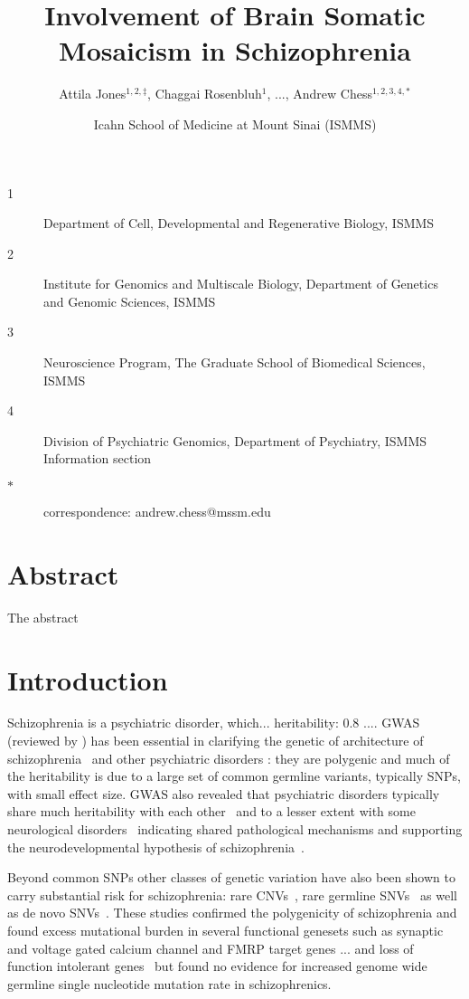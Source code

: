 \documentclass[letterpaper]{article}
\title{Involvement of Brain Somatic Mosaicism in Schizophrenia}
\author{Attila Jones\(^{1,2,\ddagger}\), Chaggai Rosenbluh\(^{1}\), ..., Andrew Chess\(^{1,2,3,4,\ast}\)}
\date{Icahn School of Medicine at Mount Sinai (ISMMS)}
\begin{document}
\maketitle

\begin{description}
\item[1] Department of Cell, Developmental and Regenerative Biology, ISMMS 
\item[2] Institute for Genomics and Multiscale Biology, Department of Genetics and Genomic Sciences, ISMMS 
\item[3] Neuroscience Program, The Graduate School of Biomedical Sciences, ISMMS 
\item[4] Division of Psychiatric Genomics, Department of Psychiatry, ISMMS 
Information section
\item[\(\ast\)] correspondence: andrew.chess@mssm.edu 
\end{description}

\clearpage

\section*{Abstract}

The abstract

\section*{Introduction}

Schizophrenia is a psychiatric disorder, which... heritability: 0.8 ...\cite{Kahn2015}.  
GWAS (reviewed by \cite{Visscher2017}) has been essential in clarifying the
genetic of architecture of schizophrenia~\cite{Ripke2014,Pardinas2018} and other psychiatric disorders
\cite{Sullivan2012}: they are polygenic and much of the heritability is due to
a large set of common germline variants, typically SNPs, with
small effect size.  GWAS also revealed that psychiatric disorders
typically share much heritability with each
other~\cite{Consortium2009,PsychiatricGenomicsConsortium2013} and to a lesser extent with
some neurological disorders~\cite{Consortium2018} indicating shared
pathological mechanisms and supporting the neurodevelopmental hypothesis of
schizophrenia~\cite{Nour2015}.

Beyond common SNPs other classes of genetic variation have also been shown to
carry substantial risk for schizophrenia: rare CNVs~\cite{Rees2014}, rare germline
SNVs~\cite{Purcell2014,Singh2017} as well as de novo
SNVs~\cite{Fromer2014,Rees2020}.  These studies confirmed the polygenicity of
schizophrenia and found excess mutational burden in several functional
genesets such as synaptic and voltage gated calcium channel and FMRP target
genes\cite{Fromer2014,Purcell2014} ... and loss of function intolerant
genes~\cite{Rees2020,Singh2017} but found no evidence for increased genome
wide germline single nucleotide mutation rate in schizophrenics.
\end{document}

